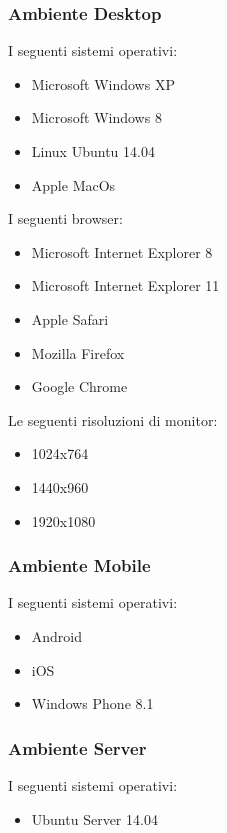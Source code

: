 \subsubsection{Ambiente Desktop}
I seguenti sistemi operativi:
\begin{itemize}
\item Microsoft Windows XP
\item Microsoft Windows 8
\item Linux Ubuntu 14.04
\item Apple MacOs 
\end{itemize}
I seguenti browser:
\begin{itemize}
\item Microsoft Internet Explorer 8
\item Microsoft Internet Explorer 11
\item Apple Safari
\item Mozilla Firefox
\item Google Chrome
\end{itemize}
Le seguenti risoluzioni di monitor:
\begin{itemize}
\item 1024x764
\item 1440x960
\item 1920x1080
\end{itemize}

\subsubsection{Ambiente Mobile}
I seguenti sistemi operativi:
\begin{itemize}
\item Android
\item iOS
\item Windows Phone 8.1
\end{itemize}

\subsubsection{Ambiente Server}
I seguenti sistemi operativi:
\begin{itemize}
\item Ubuntu Server 14.04
\end{itemize}